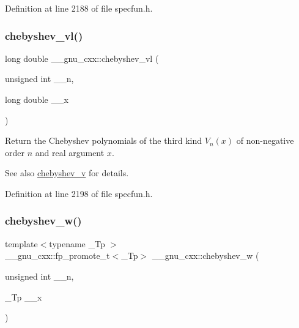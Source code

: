 Definition at line 2188 of file specfun.\+h.

\mbox{\label{group__gnu__math__spec__func_gae387ee1bfcd52555ad4d690f5888a078}} 
\subsubsection{\texorpdfstring{chebyshev\+\_\+vl()}{chebyshev\_vl()}}
{\footnotesize\ttfamily long double \+\_\+\+\_\+gnu\+\_\+cxx\+::chebyshev\+\_\+vl (\begin{DoxyParamCaption}\item[{unsigned int}]{\+\_\+\+\_\+n,  }\item[{long double}]{\+\_\+\+\_\+x }\end{DoxyParamCaption})\hspace{0.3cm}{\ttfamily [inline]}}

Return the Chebyshev polynomials of the third kind $ V_n(x) $ of non-\/negative order $ n $ and real argument $ x $.

\begin{DoxySeeAlso}{See also}
\hyperlink{group__gnu__math__spec__func_ga32b7decd0002f542d2c9187c5f0846c6}{chebyshev\+\_\+v} for details. 
\end{DoxySeeAlso}


Definition at line 2198 of file specfun.\+h.

\mbox{\label{group__gnu__math__spec__func_gaa156c6c21e99104ebcb627e92aceada0}} 
\subsubsection{\texorpdfstring{chebyshev\+\_\+w()}{chebyshev\_w()}}
{\footnotesize\ttfamily template$<$typename \+\_\+\+Tp $>$ \\
\+\_\+\+\_\+gnu\+\_\+cxx\+::fp\+\_\+promote\+\_\+t$<$\+\_\+\+Tp$>$ \+\_\+\+\_\+gnu\+\_\+cxx\+::chebyshev\+\_\+w (\begin{DoxyParamCaption}\item[{unsigned int}]{\+\_\+\+\_\+n,  }\item[{\+\_\+\+Tp}]{\+\_\+\+\_\+x }\end{DoxyParamCaption})\hspace{0.3cm}{\ttfamily [inline]}}

